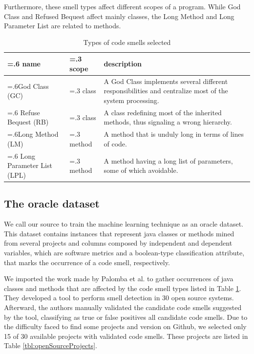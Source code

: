 Furthermore, these smell types affect different scopes of a program. While God Class and Refused Bequest affect mainly classes,
the Long Method and Long Parameter List are related to methods.

\begin{table}[ht]
\centering
\setlength{\extrarowheight}{0pt}
\addtolength{\extrarowheight}{\aboverulesep}
\addtolength{\extrarowheight}{\belowrulesep}
\setlength{\aboverulesep}{0pt}
\setlength{\belowrulesep}{0pt}
\caption{Types of code smells selected \cite{fowler1999refactoring}}
\label{tbl:codeSmellTypes}
\begin{tabularx}{\columnwidth}{>{\hsize=.6\hsize}X>{\hsize=.3\hsize}X>{\hsize=1.1\hsize}X}
\toprule
\rowcolor[rgb]{0.753,0.753,0.753}  \textbf{name}      & \textbf{scope}      & \textbf{description}            \\ 
\toprule
God Class (GC)                                             & class & A God Class implements several different responsibilities and centralize most of the system processing.  \\
\rowcolor[rgb]{0.753,0.753,0.753} Refuse Bequest (RB)      & class & A class redefining most of the inherited methods, thus signaling a wrong hierarchy.                      \\
Long Method (LM)                                       & method & A method that is unduly long in terms of lines of code.                                                  \\
\rowcolor[rgb]{0.753,0.753,0.753} Long Parameter List (LPL)& method & A method having a long list of parameters, some of which avoidable.                                      \\
\bottomrule
\end{tabularx}
\end{table}

\subsection{The oracle dataset}

We call our source to train the machine learning technique as an oracle dataset. This dataset contains instances that represent java classes or methods mined from several projects and columns composed by independent and dependent variables, which are software metrics and a boolean-type classification attribute, that marks the occurrence of a code smell, respectively. 

We imported the work made by Palomba et al. \cite{palomba2018diffuseness} to gather occurrences of java classes and methods that are affected by the code smell types listed in Table \ref{tbl:codeSmellTypes}. They developed a tool to perform smell detection in 30 open source systems. Afterward, the authors manually validated the candidate code smells suggested by the tool, classifying as true or false positives all candidate code smells. Due to the difficulty faced to find some projects and version on Github, we selected only 15 of 30 available projects with validated code smells. These projects are listed in Table \ref{tbl:openSourceProjects}. 

